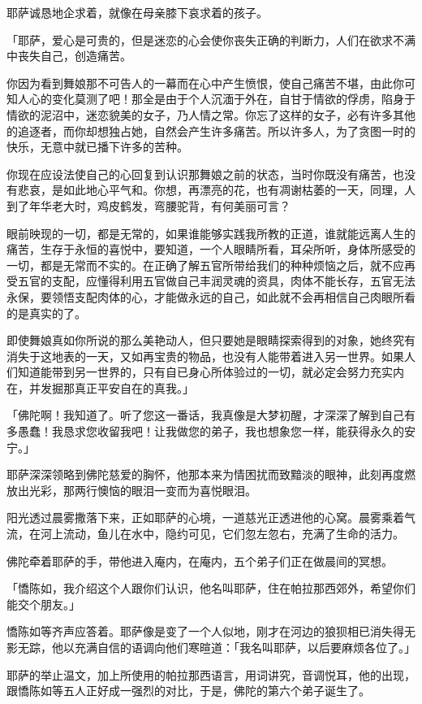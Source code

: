 \documentclass[twoside,openany]{book}
\begin{document}
耶萨诚恳地企求着，就像在母亲膝下哀求着的孩子。

「耶萨，爱心是可贵的，但是迷恋的心会使你丧失正确的判断力，人们在欲求不满中丧失自己，创造痛苦。

你因为看到舞娘那不可告人的一幕而在心中产生愤恨，使自己痛苦不堪，由此你可知人心的变化莫测了吧！那全是由于个人沉湎于外在，自甘于情欲的俘虏，陷身于情欲的泥沼中，迷恋貌美的女子，乃人情之常。你忘了这样的女子，必有许多其他的追逐者，而你却想独占她，自然会产生许多痛苦。所以许多人，为了贪图一时的快乐，无意中就已播下许多的苦种。

你现在应设法使自己的心回复到认识那舞娘之前的状态，当时你既没有痛苦，也没有悲哀，是如此地心平气和。你想，再漂亮的花，也有凋谢枯萎的一天，同理，人到了年华老大时，鸡皮鹤发，弯腰驼背，有何美丽可言？

眼前映现的一切，都是无常的，如果谁能够实践我所教的正道，谁就能远离人生的痛苦，生存于永恒的喜悦中，要知道，一个人眼睛所看，耳朵所听，身体所感受的一切，都是无常而不实的。在正确了解五官所带给我们的种种烦恼之后，就不应再受五官的支配，应懂得利用五官做自己丰润灵魂的资具，肉体不能长存，五官无法永保，要领悟支配肉体的心，才能做永远的自己，如此就不会再相信自己肉眼所看的是真实的了。

即使舞娘真如你所说的那么美艳动人，但只要她是眼睛探索得到的对象，她终究有消失于这地表的一天，又如再宝贵的物品，也没有人能带着进入另一世界。如果人们知道能带到另一世界的，只有自已身心所体验过的一切，就必定会努力充实内在，并发掘那真正平安自在的真我。」

「佛陀啊！我知道了。听了您这一番话，我真像是大梦初醒，才深深了解到自己有多愚蠢！我恳求您收留我吧！让我做您的弟子，我也想象您一样，能获得永久的安宁。」

耶萨深深领略到佛陀慈爱的胸怀，他那本来为情困扰而致黯淡的眼神，此刻再度燃放出光彩，那两行懊恼的眼泪一变而为喜悦眼泪。

阳光透过晨雾撒落下来，正如耶萨的心境，一道慈光正透进他的心窝。晨雾乘着气流，在河上流动，鱼儿在水中，隐约可见，它们忽左忽右，充满了生命的活力。

佛陀牵着耶萨的手，带他进入庵内，在庵内，五个弟子们正在做晨间的冥想。

「憍陈如，我介绍这个人跟你们认识，他名叫耶萨，住在帕拉那西郊外，希望你们能交个朋友。」

憍陈如等齐声应答着。耶萨像是变了一个人似地，刚才在河边的狼狈相已消失得无影无踪，他以充满自信的语调向他们寒暄道：「我名叫耶萨，以后要麻烦各位了。」

耶萨的举止温文，加上所使用的帕拉那西语言，用词讲究，音调悦耳，他的出现，跟憍陈如等五人正好成一强烈的对比，于是，佛陀的第六个弟子诞生了。
\end{document}
